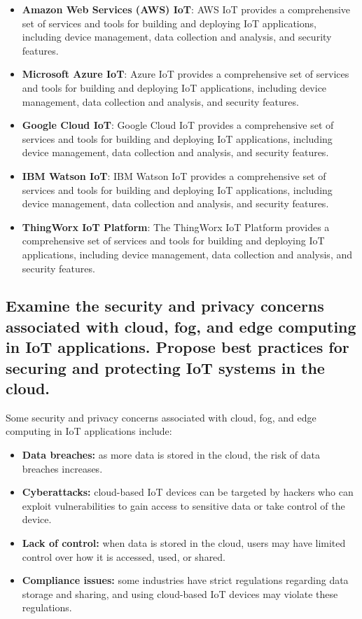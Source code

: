 \documentclass[12pt, a4paper, oneside]{article}
\begin{document}
\begin{itemize}
	\item \textbf{Amazon Web Services (AWS) IoT}: AWS IoT provides a comprehensive set of services and tools for building and deploying IoT applications, including device management, data collection and analysis, and security features.
	\item \textbf{Microsoft Azure IoT}: Azure IoT provides a comprehensive set of services and tools for building and deploying IoT applications, including device management, data collection and analysis, and security features.
	\item \textbf{Google Cloud IoT}: Google Cloud IoT provides a comprehensive set of services and tools for building and deploying IoT applications, including device management, data collection and analysis, and security features.
	\item \textbf{IBM Watson IoT}: IBM Watson IoT provides a comprehensive set of services and tools for building and deploying IoT applications, including device management, data collection and analysis, and security features.
	\item \textbf{ThingWorx IoT Platform}: The ThingWorx IoT Platform provides a comprehensive set of services and tools for building and deploying IoT applications, including device management, data collection and analysis, and security features.
\end{itemize}

\subsection{Examine the security and privacy concerns associated with cloud, fog, and edge computing in IoT applications. Propose best practices for securing and protecting IoT systems in the cloud.}

Some security and privacy concerns associated with cloud, fog, and edge computing in IoT applications include:

\begin{itemize}
	\item \textbf{Data breaches:} as more data is stored in the cloud, the risk of data breaches increases.
	\item \textbf{Cyberattacks:} cloud-based IoT devices can be targeted by hackers who can exploit vulnerabilities to gain access to sensitive data or take control of the device.
	\item \textbf{Lack of control:} when data is stored in the cloud, users may have limited control over how it is accessed, used, or shared.
	\item \textbf{Compliance issues:} some industries have strict regulations regarding data storage and sharing, and using cloud-based IoT devices may violate these regulations.
\end{itemize}
\end{document}
